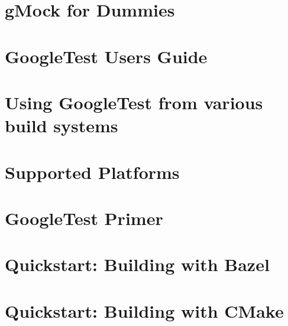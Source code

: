 \let\mypdfximage\pdfximage\def\pdfximage{\immediate\mypdfximage}\documentclass[twoside]{book}
\newcommand{\+}{\discretionary{\mbox{\scriptsize$\hookleftarrow$}}{}{}}
\begin{document}
\chapter{g\+Mock for Dummies}
\label{md_build__deps_googletest_src_docs_gmock_for_dummies}

\chapter{Google\+Test User\textquotesingle{}s Guide}
\label{md_build__deps_googletest_src_docs_index}

\chapter{Using Google\+Test from various build systems}
\label{md_build__deps_googletest_src_docs_pkgconfig}

\chapter{Supported Platforms}
\label{md_build__deps_googletest_src_docs_platforms}

\chapter{Google\+Test Primer}
\label{md_build__deps_googletest_src_docs_primer}

\chapter{Quickstart\+: Building with Bazel}
\label{md_build__deps_googletest_src_docs_quickstart_bazel}

\chapter{Quickstart\+: Building with CMake}
\label{md_build__deps_googletest_src_docs_quickstart_cmake}

\end{document}
